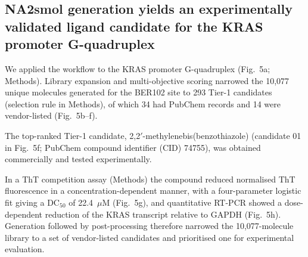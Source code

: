 \documentclass[pdflatex,sn-mathphys-num]{sn-jnl}
\theoremstyle{thmstyleone}
\theoremstyle{thmstyletwo}
\theoremstyle{thmstylethree}
\begin{document}
\subsection{NA2smol generation yields an experimentally validated ligand candidate for the KRAS promoter G-quadruplex}

We applied the workflow to the KRAS promoter G-quadruplex (Fig.~5a; Methods). Library expansion and multi-objective scoring narrowed the 10,077 unique molecules generated for the BER102 site to 293 Tier-1 candidates (selection rule in Methods), of which 34 had PubChem records and 14 were vendor-listed (Fig.~5b--f).

The top-ranked Tier-1 candidate, 2,2$'$-methylenebis(benzothiazole) (candidate 01 in Fig.~5f; PubChem compound identifier (CID) 74755), was obtained commercially and tested experimentally.

In a ThT competition assay (Methods) the compound reduced normalised ThT fluorescence in a concentration-dependent manner, with a four-parameter logistic fit giving a DC$_{50}$ of 22.4~$\mu$M (Fig.~5g), and quantitative RT-PCR showed a dose-dependent reduction of the KRAS transcript relative to GAPDH (Fig.~5h). Generation followed by post-processing therefore narrowed the 10,077-molecule library to a set of vendor-listed candidates and prioritised one for experimental evaluation.
\end{document}
